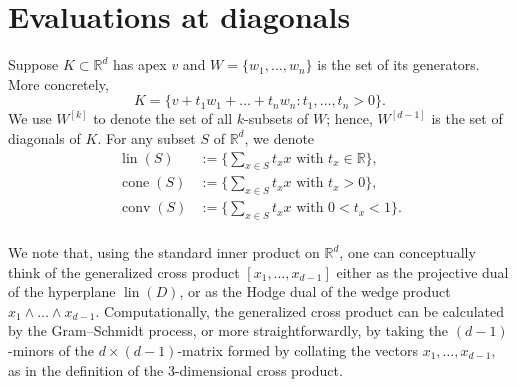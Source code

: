 \documentclass{article}
\DeclareMathOperator{\conv}{conv}
\DeclareMathOperator{\cone}{cone}
\DeclareMathOperator{\lin}{lin}
\begin{document}
\section{Evaluations at diagonals}
Suppose $K \subset \mathbb{R}^d$ has apex $v$ and $W = \{w_1, \dots, w_n\}$ is the set of its generators. More concretely, 
\begin{equation}
	K = \{v + t_1 w_1 + \dots + t_n w_n : t_1, \dots, t_n > 0\}.
\end{equation}
We use $W^{[k]}$ to denote the set of all $k$-subsets of $W$; hence, $W^{[d-1]}$ is the set of diagonals of $K$. For any subset $S$ of $\mathbb{R}^d$, we denote
\begin{align*}
	\lin(S) &:= \{\sum_{x \in S} t_x x \text{ with } t_x \in \mathbb{R}\}, \\
	\cone(S) &:= \{\sum_{x \in S} t_x x \text{ with } t_x > 0\}, \\
	\conv(S) &:= \{\sum_{x \in S} t_x x \text{ with } 0 < t_x < 1\}. \\
\end{align*}

We note that, using the standard inner product on $\mathbb{R}^d$, one can conceptually think of the generalized cross product $[x_1, \dots, x_{d-1}]$ either as the projective dual of the hyperplane $\lin(D)$, or as the Hodge dual of the wedge product $x_1 \wedge \dots \wedge x_{d-1}$. Computationally, the generalized cross product can be calculated by the Gram--Schmidt process, or more straightforwardly, by taking the $(d-1)$-minors of the $d \times (d-1)$-matrix formed by collating the vectors $x_1, \dots, x_{d-1}$, as in the definition of the $3$-dimensional cross product.
\end{document}
